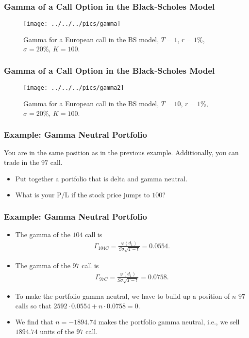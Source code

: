 \begin{frame}[fragile]
\frametitle{Gamma of a Call Option in the Black-Scholes Model}
\begin{figure}[htp]
\begin{center}
  \texttt{[image: ../../../pics/gamma]}
  \caption{Gamma for a European call in the BS model, $T=1$, $r=1\%$,
  $\sigma=20\%$, $K=100$.}
  \label{fig:gammaBS}
\end{center}
\end{figure}
\end{frame}

\begin{frame}[fragile]
\frametitle{Gamma of a Call Option in the Black-Scholes Model}
\begin{figure}[htp]
\begin{center}
  \texttt{[image: ../../../pics/gamma2]}
  \caption{Gamma for a European call in the BS model, $T=10$, $r=1\%$,
  $\sigma=20\%$, $K=100$.}
  \label{fig:gamma2BS}
\end{center}
\end{figure}
\end{frame}

\begin{frame}[fragile]
\frametitle{Example: Gamma Neutral Portfolio}
You are in the same position as in the previous example. Additionally, you can
trade in the $97$ call.
\begin{itemize}
  \item Put together a portfolio that is delta and gamma neutral.
  \item What is your P/L if the stock price jumps to $100$?
\end{itemize}
\end{frame}

\begin{frame}[fragile]
\frametitle{Example: Gamma Neutral Portfolio}
\begin{itemize}
  \item The gamma of the $104$ call is
  \begin{align*}
  \Gamma_{104C} = \frac{\varphi(d_1)}{S\sigma \sqrt{T-t}} = 0.0554.
  \end{align*}
  \item The gamma of the $97$ call is
  \begin{align*}
  \Gamma_{97C} = \frac{\varphi(d_1)}{S\sigma \sqrt{T-t}} = 0.0758.
  \end{align*}
  \item To make the portfolio gamma neutral, we have to build up a position of
  $n$ $97$ calls so that $2592\cdot 0.0554 +n\cdot 0.0758 = 0$.
  \item We find that $n=-1894.74$ makes the portfolio gamma neutral, i.e., we
  sell $1894.74$ units of the $97$ call.
\end{itemize}
\end{frame}

